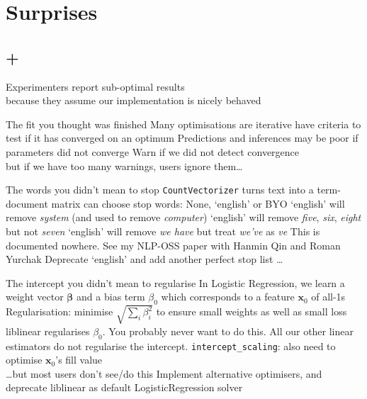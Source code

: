\documentclass[aspectratio=169, 22pt]{beamer}
\newcommand{\hl}{\textcolor{usydred}}
\newenvironment{sectionslide}
			{\subsection*{+}\begin{frame}[fragile,environment=sectionslide]\vfill\begin{center}\Large}
			{\end{center}\vfill\end{frame}}
\begin{document}
\section{Surprises}

\begin{sectionslide}
	Experimenters report sub-optimal results\\
	because they assume our implementation is nicely behaved
\end{sectionslide}

\begin{points}{The fit you thought was finished}
	\p Many optimisations are iterative
	\p have criteria to test if it has converged on an optimum
	\p Predictions and inferences may be poor if parameters did not converge
	\pause
	\p[Solution] Warn if we did not detect convergence \\
	but if we have too many warnings, users ignore them\ldots
\end{points}

\begin{points}{The words you didn't mean to stop}
	\p \verb|CountVectorizer| turns text into a term-document matrix
	\p can choose stop words: None, `english' or BYO
	\p `english' will remove \emph{system} (and used to remove \emph{computer})
	\p `english' will remove \emph{five}, \emph{six}, \emph{eight} but not \emph{seven}
	\p `english' will remove \emph{we have} but treat \emph{we've} as \emph{ve}
	\p This is documented nowhere.
	\p See my NLP-OSS paper with Hanmin Qin and Roman Yurchak
	\pause
	\p[Solution] Deprecate `english' 
	\pause and add another \hl{perfect} stop list \ldots
\end{points}

\begin{points}{The intercept you didn't mean to regularise}
	\p In Logistic Regression, we learn a weight vector $\mathbf{\beta}$
	\p and a bias term $\beta_0$ which corresponds to a feature $\mathbf{x}_0$ of all-1s
	\p Regularisation: minimise $\sqrt{\sum_i \beta_i^2}$ to ensure small weights as well as small loss 
	\p liblinear regularises $\beta_0$. You probably never want to do this.
	\p All our other linear estimators do not regularise the intercept.
	\pause
	\p[Sol'n 1] \verb|intercept_scaling|: also need to optimise $\mathbf{x}_0$'s fill value\\
	\pause
	\ldots but most users don't see/do this
	\p[Sol'n 2] Implement alternative optimisers, and deprecate liblinear as default LogisticRegression solver
\end{points}
\end{document}
